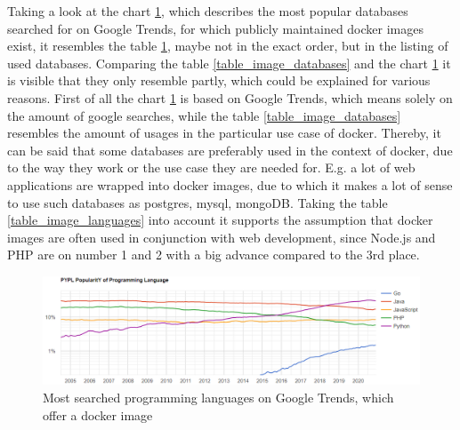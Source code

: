 Taking a look at the chart \ref{fig:databases_top_ranking}, which describes the most popular databases searched for on Google Trends, for which publicly maintained docker images exist, it resembles the table \ref{fig:databases_top_ranking}, maybe not in the exact order, but in the listing of used databases.
Comparing the table \ref{table_image_databases} and the chart \ref{fig:databases_top_ranking} it is visible that they only resemble partly, which could be explained for various reasons. First of all the chart \ref{fig:databases_top_ranking} is based on Google Trends, which means solely on the amount of google searches, while the table \ref{table_image_databases} resembles the amount of usages in the particular use case of docker. Thereby, it can be said that some databases are preferably used in the context of docker, due to the way they work or the use case they are needed for. E.g. a lot of web applications are wrapped into docker images, due to which it makes a lot of sense to use such databases as postgres, mysql, mongoDB. Taking the table \ref{table_image_languages} into account it supports the assumption that docker images are often used in conjunction with web development, since Node.js and PHP are on number 1 and 2 with a big advance compared to the 3rd place.

\begin{figure}[H]
    \centering
    \includegraphics[scale=0.5]{graphics/languages_top_popularity_ranking.png}
    \caption{Most searched programming languages on Google Trends, which offer a docker image}
    \label{fig:databases_top_ranking}
\end{figure}

